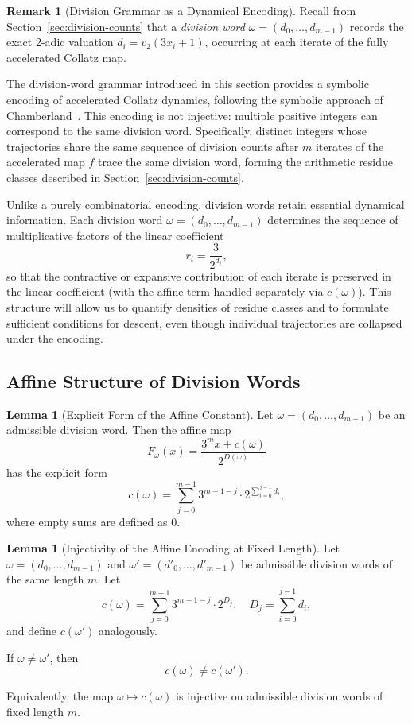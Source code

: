 \documentclass[12pt, oneside]{article}   	%
\numberwithin{equation}{section}          %
\theoremstyle{definition}
\newtheorem{lemma}[theorem]{Lemma}
\newtheorem*{remark}{Remark}
\begin{document}
\begin{remark}[Division Grammar as a Dynamical Encoding]
Recall from Section~\ref{sec:division-counts} that a \emph{division word}
$\omega=(d_0,\dots,d_{m-1})$ records the exact 2-adic valuation
$d_i = v_2(3 x_i + 1)$, occurring at each iterate of the fully accelerated
Collatz map.

The division-word grammar introduced in this section provides a symbolic
encoding of accelerated Collatz dynamics, following the symbolic approach
of Chamberland~\cite{Chamberland2003}. This encoding is not injective:
multiple positive integers can correspond to the same division word.
Specifically, distinct integers whose trajectories share the same sequence
of division counts after $m$ iterates of the accelerated map $f$ trace the
same division word, forming the arithmetic residue classes described in
Section~\ref{sec:division-counts}.

Unlike a purely combinatorial encoding, division words retain essential
dynamical information. Each division word $\omega=(d_0,\dots,d_{m-1})$
determines the sequence of multiplicative factors of the linear coefficient
\[
r_i = \frac{3}{2^{d_i}},
\]
so that the contractive or expansive contribution of each iterate is
preserved in the linear coefficient (with the affine term handled separately
via $c(\omega)$). This structure will allow us to quantify densities of
residue classes and to formulate sufficient conditions for descent, even
though individual trajectories are collapsed under the encoding.
\end{remark}

\subsection{Affine Structure of Division Words}

\begin{lemma}[Explicit Form of the Affine Constant]
Let $\omega = (d_0,\dots,d_{m-1})$ be an admissible division word.  
Then the affine map
\[
F_\omega(x) = \frac{3^m x + c(\omega)}{2^{D(\omega)}}
\]
has the explicit form
\[
c(\omega)
=
\sum_{j=0}^{m-1}
3^{m-1-j}\cdot 2^{\sum_{i=0}^{j-1} d_i},
\]
where empty sums are defined as $0$.
\end{lemma}

\begin{lemma}[Injectivity of the Affine Encoding at Fixed Length]
\label{lem:injectivity}
Let $\omega = (d_0,\dots,d_{m-1})$ and $\omega' = (d'_0,\dots,d'_{m-1})$
be admissible division words of the same length $m$. Let
\[
c(\omega)
=
\sum_{j=0}^{m-1}
3^{m-1-j}\cdot 2^{D_j},
\quad
D_j = \sum_{i=0}^{j-1} d_i,
\]
and define $c(\omega')$ analogously.

If $\omega \ne \omega'$, then
\[
c(\omega) \ne c(\omega').
\]

Equivalently, the map $\omega \mapsto c(\omega)$ is injective on admissible
division words of fixed length $m$.
\end{lemma}
\end{document}
